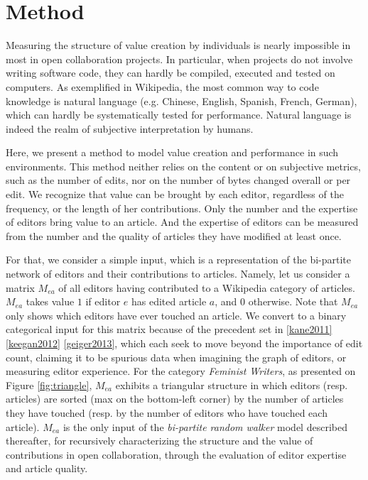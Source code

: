 \section{Method}
\label{method}
Measuring the structure of value creation by individuals is nearly impossible in most in open collaboration projects. In particular, when projects do not involve writing software code, they can hardly be compiled, executed and tested on computers. As exemplified in Wikipedia, the most common way to code knowledge is natural language (e.g. Chinese, English, Spanish, French, German), which can hardly be systematically tested for performance. Natural language is indeed the realm of subjective interpretation by humans. 

Here, we present a method to model value creation and performance in such environments. This method neither relies on the content or on subjective metrics, such as the number of edits, nor on the number of bytes changed overall or per edit. We recognize that value can be brought by each editor, regardless of the frequency, or the length of her contributions. Only the number and the expertise of editors bring value to an article.  And the expertise of editors can be measured from the number and the quality of articles they have modified at least once.

For that, we consider a simple input, which is a representation of the bi-partite network of editors and their contributions to articles.  Namely, let us consider a matrix $M_{ea}$ of all editors having contributed to a Wikipedia category of articles. $M_{ea}$ takes value $1$ if editor $e$ has edited article $a$, and $0$ otherwise. Note that $M_{ea}$ only shows which editors have ever touched an article. We convert to a binary categorical input for this matrix because of the precedent set in \ref{kane2011} \ref{keegan2012} \ref{geiger2013}, which each seek to move beyond the importance of edit count, claiming it to be spurious data when imagining the graph of editors, or measuring editor experience. For the category {\it Feminist Writers}, as presented on Figure \ref{fig:triangle}, $M_{ea}$ exhibits a triangular structure in which editors (resp. articles) are sorted (max on the bottom-left corner) by the number of articles they have touched (resp. by the number of editors who have touched each article). $M_{ea}$ is the only input of the {\it bi-partite random walker} model described thereafter, for recursively characterizing the structure and the value of contributions in open collaboration, through the evaluation of editor expertise and article quality.

